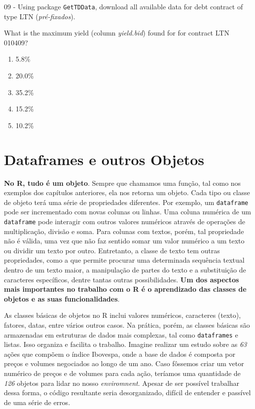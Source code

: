 \documentclass[
  11pt,
]{book}
\providecommand{\tightlist}{%
  \setlength{\itemsep}{0pt}\setlength{\parskip}{0pt}}
\begin{document}
09 -
Using package \texttt{GetTDData}, download all available data for debt contract of type LTN (\emph{pré-fixados}).

What is the maximum yield (column \emph{yield.bid}) found for for contract LTN 010409?

\begin{enumerate}
\def\labelenumi{\alph{enumi})}
\tightlist
\item
  5.8\%
\item
  20.0\%
\item
  35.2\%
\item
  15.2\%
\item
  10.2\%
\end{enumerate}

\hypertarget{classe-estrutura}{%
\chapter{Dataframes e outros Objetos}\label{classe-estrutura}}

\textbf{No R, tudo é um objeto}. Sempre que chamamos uma função, tal como nos exemplos dos capítulos anteriores, ela nos retorna um objeto. Cada tipo ou classe de objeto terá uma série de propriedades diferentes. Por exemplo, um \texttt{dataframe} pode ser incrementado com novas colunas ou linhas. Uma coluna numérica de um \texttt{dataframe} pode interagir com outros valores numéricos através de operações de multiplicação, divisão e soma. Para colunas com textos, porém, tal propriedade não é válida, uma vez que não faz sentido somar um valor numérico a um texto ou dividir um texto por outro. Entretanto, a classe de texto tem outras propriedades, como a que permite procurar uma determinada sequência textual dentro de um texto maior, a manipulação de partes do texto e a substituição de caracteres específicos, dentre tantas outras possibilidades. \textbf{Um dos aspectos mais importantes no trabalho com o R é o aprendizado das classes de objetos e as suas funcionalidades}.

As classes básicas de objetos no R inclui valores numéricos, caracteres (texto), fatores, datas, entre vários outros casos. Na prática, porém, as classes básicas são armazenadas em estruturas de dados mais complexas, tal como \texttt{dataframes} e listas. Isso organiza e facilita o trabalho. Imagine realizar um estudo sobre as \emph{63} ações que compõem o índice Ibovespa, onde a base de dados é composta por preços e volumes negociados ao longo de um ano. Caso fôssemos criar um vetor numérico de preços e de volumes para cada ação, teríamos uma quantidade de \emph{126} objetos para lidar no nosso \emph{enviromnent}. Apesar de ser possível trabalhar dessa forma, o código resultante seria desorganizado, difícil de entender e passível de uma série de erros.
\end{document}
